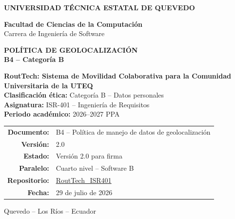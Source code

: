 \documentclass[10pt,a4paper]{article}
\newcommand{\Proyecto}{RoutTech: Sistema de Movilidad Colaborativa para la Comunidad Universitaria de la UTEQ}
\newcommand{\Asignatura}{ISR-401 -- Ingeniería de Requisitos}
\newcommand{\Periodo}{2026--2027 PPA}
\newcommand{\CategoriaEtica}{Categoría B -- Datos personales}
\newcommand{\Repositorio}{https://github.com/AnderJM3/RoutTech_ISR401}
\newcommand{\FechaDocumento}{29 de julio de 2026}
\newcommand{\VersionDocumento}{2.0}
\newcommand{\Paralelo}{Cuarto nivel -- Software B}
\begin{document}
\justifying

\thispagestyle{empty}

\vspace*{0.65cm}
\begin{center}
{\color{white}\Large\bfseries UNIVERSIDAD TÉCNICA ESTATAL DE QUEVEDO}

\vspace{1.75cm}
{\large\bfseries\color{RTForest} Facultad de Ciencias de la Computación\\[4pt]}
{\normalsize\color{RTGray} Carrera de Ingeniería de Software}

\vspace{0.8cm}

{\Huge\bfseries\color{RTForest} POLÍTICA DE GEOLOCALIZACIÓN\\[8pt]}
{\Large\bfseries\color{RTTerracotta} B4 -- Categoría B}

\vspace{1.0cm}

\begin{tcolorbox}[width=0.90\textwidth,colback=RTCream,colframe=RTGold,boxrule=1pt,arc=2mm]
\centering
{\large\bfseries \Proyecto}\\[7pt]
\textbf{Clasificación ética:} \CategoriaEtica\\
\textbf{Asignatura:} \Asignatura\\
\textbf{Periodo académico:} \Periodo
\end{tcolorbox}

\vfill
\begin{tabular}{rl}
\textbf{Documento:} & B4 -- Política de manejo de datos de geolocalización\\
\textbf{Versión:} & \VersionDocumento\\
\textbf{Estado:} & Versión 2.0 para firma\\
\textbf{Paralelo:} & \Paralelo\\
\textbf{Repositorio:} & \href{\Repositorio}{RoutTech\_ISR401}\\
\textbf{Fecha:} & \FechaDocumento
\end{tabular}

\vspace{0.75cm}
{\small Quevedo -- Los Ríos -- Ecuador}
\end{center}
\clearpage
\end{document}
